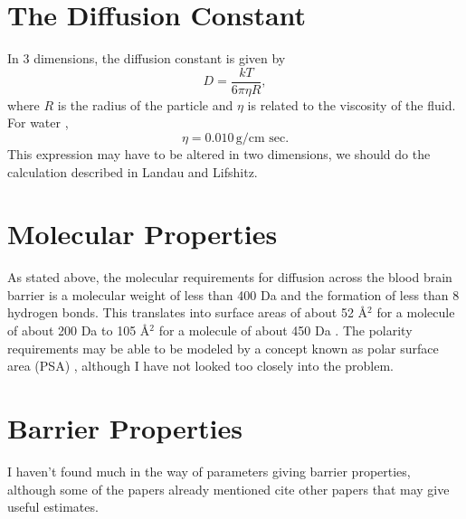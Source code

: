 \documentclass[letter]{article}
\begin{document}
\section{The Diffusion Constant}
In 3 dimensions, the diffusion constant is given by \cite{LLFluids}
$$D = \frac{kT}{6\pi \eta R},$$
where $R$ is the radius of the particle and $\eta$ is related to the viscosity of the fluid. For water \cite{LLFluids},
$$\eta = 0.010\,\text{g/cm sec}.$$
This expression may have to be altered in two dimensions, we should do the calculation described in Landau and Lifshitz.
\section{Molecular Properties}
As stated above, the molecular requirements for diffusion across the blood brain barrier is a molecular weight of less than 400 Da and the formation of less than 8 hydrogen bonds. This translates into surface areas of about 52 \AA$^2$ for a molecule of about 200 Da to 105 \AA$^2$ for a molecule of about 450 Da \cite{Pardridge2005}. The polarity requirements may be able to be modeled by a concept known as polar surface area (PSA) \cite{PajouheshLenz2005}, although I have not looked too closely into the problem.
\section{Barrier Properties}
I haven't found much in the way of parameters giving barrier properties, although some of the papers already mentioned cite other papers that may give useful estimates.



\end{document}
